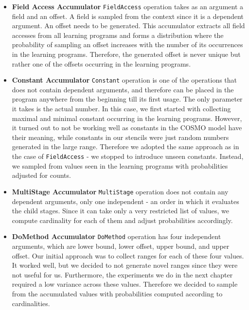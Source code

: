 \documentclass[sigplan,\review anonymous]{acmart}
\begin{document}
\begin{itemize}
  \item \textbf{Field Access Accumulator} \texttt{FieldAccess} operation
  takes as an argument a field and an offset. A field is sampled from the
  context since it is a dependent argument. An offset needs to be generated.
  This accumulator extracts all field accesses from all learning programs
  and forms a distribution where the probability of sampling an offset
  increases with the number of its occurrences in the learning programs.
  Therefore, the generated offset is never unique but rather one of the
  offsets occurring in the learning programs.

  \item \textbf{Constant Accumulator} \texttt{Constant} operation is one
  of the operations that does not contain dependent arguments, and therefore
  can be placed in the program anywhere from the beginning till its first
  usage. The only parameter it takes is the actual number. In this case,
  we first started with collecting maximal and minimal constant occurring
  in the learning programs. However, it turned out to not be working well
  as constants in the COSMO model have their meaning, while constants in our
  stencils were just random numbers generated in the large range. Therefore
  we adopted the same approach as in the case of \texttt{FieldAccess}
  - we stopped to introduce unseen constants. Instead, we sampled from values
  seen in the learning programs with probabilities adjusted for counts.

  \item \textbf{MultiStage Accumulator} \texttt{MultiStage} operation does
  not contain any dependent arguments, only one independent - an order in
  which it evaluates the child stages. Since it can take only a very
  restricted list of values, we compute cardinality for each of them and
  adjust probabilities accordingly.

  \item \textbf{DoMethod Accumulator} \texttt{DoMethod} operation has four
  independent arguments, which are lower bound, lower offset, upper bound,
  and upper offset. Our initial approach was to collect ranges for each of
  these four values. It worked well, but we decided to not generate novel
  ranges since they were not useful for us. Furthermore, the experiments we
  do in the next chapter required a low variance across these values.
  Therefore we decided to sample from the accumulated values with
  probabilities computed according to cardinalities.


\end{itemize}
\end{document}
